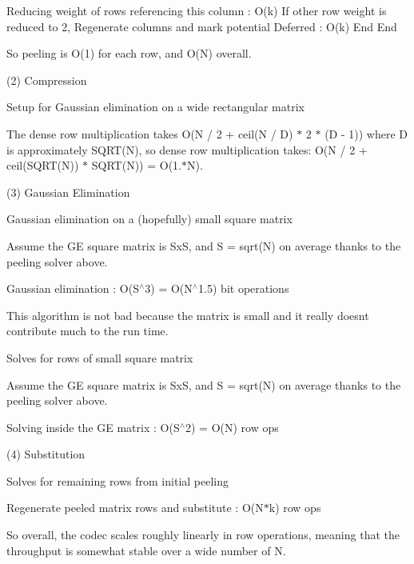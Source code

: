 Reducing weight of rows referencing this column \+: O(k) If other row weight is reduced to 2, Regenerate columns and mark potential Deferred \+: O(k) End End

So peeling is O(1) for each row, and O(\+N) overall.

(2) Compression
\begin{DoxyItemize}
\item Setup for Gaussian elimination on a wide rectangular matrix
\end{DoxyItemize}

The dense row multiplication takes O(N / 2 + ceil(N / D) $\ast$ 2 $\ast$ (D -\/ 1)) where D is approximately S\+Q\+R\+T(\+N), so dense row multiplication takes\+: O(N / 2 + ceil(\+S\+Q\+R\+T(\+N)) $\ast$ S\+Q\+R\+T(\+N)) = O(1.$\ast$N).

(3) Gaussian Elimination
\begin{DoxyItemize}
\item Gaussian elimination on a (hopefully) small square matrix
\end{DoxyItemize}

Assume the GE square matrix is SxS, and S = sqrt(\+N) on average thanks to the peeling solver above.

Gaussian elimination \+: O(\+S$^\wedge$3) = O(N$^\wedge$1.5) bit operations

This algorithm is not bad because the matrix is small and it really doesn\textquotesingle{}t contribute much to the run time.


\begin{DoxyItemize}
\item Solves for rows of small square matrix
\end{DoxyItemize}

Assume the GE square matrix is SxS, and S = sqrt(\+N) on average thanks to the peeling solver above.

Solving inside the GE matrix \+: O(\+S$^\wedge$2) = O(\+N) row ops

(4) Substitution
\begin{DoxyItemize}
\item Solves for remaining rows from initial peeling
\end{DoxyItemize}

Regenerate peeled matrix rows and substitute \+: O(\+N$\ast$k) row ops

So overall, the codec scales roughly linearly in row operations, meaning that the throughput is somewhat stable over a wide number of N.

